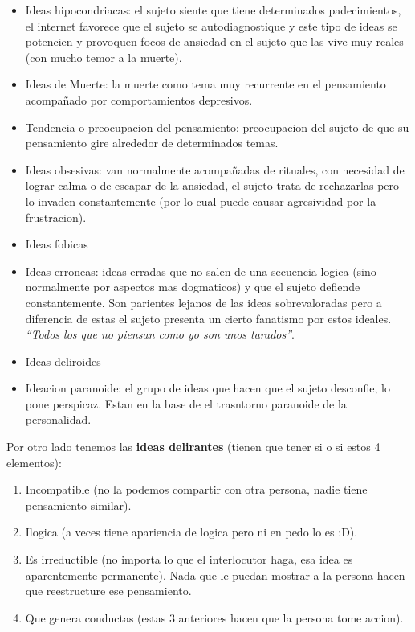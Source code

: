 \documentclass[12pt,a4paper]{article}
\begin{document}
\begin{itemize}
	\item Ideas hipocondriacas: el sujeto siente que tiene determinados padecimientos, el internet favorece que el sujeto se autodiagnostique y este tipo de ideas se potencien y provoquen focos de ansiedad en el sujeto que las vive muy reales (con mucho temor a la muerte). 
	\item Ideas de Muerte: la muerte como tema muy recurrente en el pensamiento acompañado por comportamientos depresivos. 
	\item Tendencia o preocupacion del pensamiento: preocupacion del sujeto de que su pensamiento gire alrededor de determinados temas. 
	\item Ideas obsesivas: van normalmente acompañadas de rituales, con necesidad de lograr calma o de escapar de la ansiedad, el sujeto trata de rechazarlas pero lo invaden constantemente (por lo cual puede causar agresividad por la frustracion). 
	\item Ideas fobicas
	\item Ideas erroneas: ideas erradas que no salen de una secuencia logica (sino normalmente por aspectos mas dogmaticos) y que el sujeto defiende constantemente. Son parientes lejanos de las ideas sobrevaloradas pero a diferencia de estas el sujeto presenta un cierto fanatismo por estos ideales. \textit{\enquote{Todos los que no piensan como yo son unos tarados}}. 
	\item Ideas deliroides 
	\item Ideacion paranoide: el grupo de ideas que hacen que el sujeto desconfie, lo pone perspicaz. Estan en la base de el trasntorno paranoide de la personalidad. 
\end{itemize}

Por otro lado tenemos las \textbf{ideas delirantes} (tienen que tener si o si estos 4 elementos):

\begin{enumerate}
	\item Incompatible (no la podemos compartir con otra persona, nadie tiene pensamiento similar).
	\item Ilogica (a veces tiene apariencia de logica pero ni en pedo lo es :D).
	\item Es irreductible (no importa lo que el interlocutor haga, esa idea es aparentemente permanente). Nada que le puedan mostrar a la persona hacen que reestructure ese pensamiento. 
	\item Que genera conductas (estas 3 anteriores hacen que la persona tome accion).
\end{enumerate}
\end{document}
